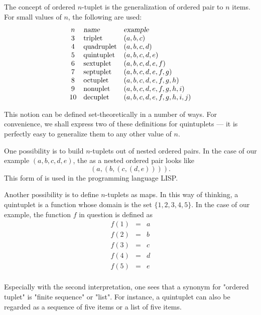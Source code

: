 \documentclass[12pt]{article}
\begin{document}
The concept of ordered $n$-tuplet is the generalization of ordered pair to $n$ items.  For small values of $n$, the following  are used:
$$\begin{matrix}
n & \hbox{\sl name} \hfill & \hbox{\sl example} \hfill \\
3 & \hbox{triplet} \hfill & (a,b,c) \hfill \\ 
4 & \hbox{quadruplet} \hfill & (a,b,c,d) \hfill \\
5 & \hbox{quintuplet} \hfill & (a,b,c,d,e) \hfill \\
6 & \hbox{sextuplet} \hfill & (a,b,c,d,e,f) \hfill \\
7 & \hbox{septuplet} \hfill & (a,b,c,d,e,f,g) \hfill \\
8 & \hbox{octuplet} \hfill & (a,b,c,d,e,f,g,h) \hfill \\
9 & \hbox{nonuplet} \hfill & (a,b,c,d,e,f,g,h,i) \hfill \\
10 & \hbox{decuplet} \hfill & (a,b,c,d,e,f,g,h,i,j) \hfill \\
\end{matrix}$$

This notion can be defined set-theoretically in a number of ways.  For convenience, we shall express two of these definitions for quintuplets --- it is perfectly easy to generalize them to any other value of $n$.

One possibility is to build $n$-tuplets out of nested ordered pairs.  In the case of our example $(a,b,c,d,e)$, the  as a nested ordered pair looks like
 $$(a,(b,(c,(d,e)))).$$
This form of  is used in the programming language LISP.

Another possibility is to define $n$-tuplets as maps.  In this way of thinking, a quintuplet is a function whose domain is the set $\{ 1, 2, 3, 4, 5 \}$.  In the case of our example, the function $f$ in question is defined as
\[ \begin{array}{ccc}
f(1) & = & a \\
f(2) & = & b \\
f(3) & = & c \\
f(4) & = & d \\
f(5) & = & e \\
\end{array} \]

Especially with the second interpretation, one sees that a synonym for "ordered tuplet" is "finite sequence" or "list".  For instance, a quintuplet can also be regarded as a sequence of five items or a list of five items.

\end{document}
